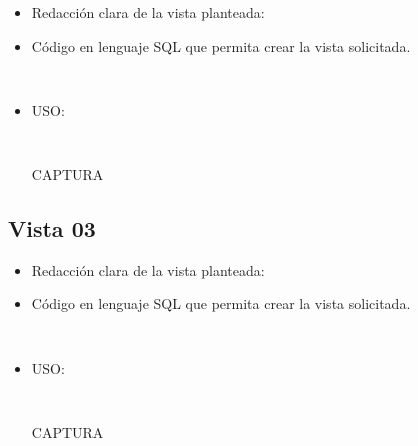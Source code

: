 \begin{itemize}
    \item Redacción clara de la vista planteada: 
    \item Código en lenguaje SQL que permita crear la vista solicitada.
    
    \begin{lstlisting}[caption={Tablas para la BdDatos}, label={lst:sql_estadios}]
      
    \end{lstlisting}    
    
    \item USO:
    
    \begin{lstlisting}[caption={Tablas para la BdDatos}, label={lst:sql_estadios}]
      
    \end{lstlisting}    

    \begin{center}
      CAPTURA
    \end{center}
\end{itemize}


\subsection*{Vista 03}

\begin{itemize}
    \item Redacción clara de la vista planteada: 
    \item Código en lenguaje SQL que permita crear la vista solicitada.
    
    \begin{lstlisting}[caption={Tablas para la BdDatos}, label={lst:sql_estadios}]
      
    \end{lstlisting}    
    
    \item USO:
    
    \begin{lstlisting}[caption={Tablas para la BdDatos}, label={lst:sql_estadios}]
      
    \end{lstlisting}    

    \begin{center}
      CAPTURA
    \end{center}
\end{itemize}